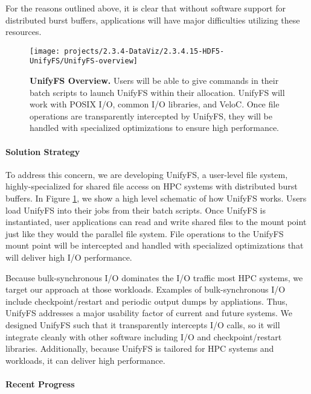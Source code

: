 For the reasons outlined above, it is clear that without software support 
for distributed burst buffers, applications
will have major difficulties utilizing these resources. 

\begin{figure}[htb]
        \centering
        \texttt{[image: projects/2.3.4-DataViz/2.3.4.15-HDF5-UnifyFS/UnifyFS-overview]}
        \caption{\label{fig:UnifyFS-overview} \textbf{UnifyFS Overview.} Users will be able to give commands in their batch scripts to launch UnifyFS within
their allocation. UnifyFS will work with POSIX I/O, common I/O libraries, and
VeloC. Once file operations are transparently intercepted by UnifyFS, they
will be handled with specialized optimizations to ensure high performance.}
\end{figure}

\paragraph{Solution Strategy}

To address this concern, we are developing UnifyFS, a user-level file system,
highly-specialized for shared file access on HPC systems with distributed
burst buffers. In Figure \ref{fig:UnifyFS-overview}, we show a high
level schematic of how UnifyFS works. Users load UnifyFS into
their jobs from their batch scripts. Once UnifyFS is instantiated, user
applications can read and write shared files to the mount point just like
they would the parallel file system. File operations to the UnifyFS
mount point will be intercepted and handled with specialized optimizations
that will deliver high I/O performance. 

Because bulk-synchronous I/O dominates the 
I/O traffic most HPC systems, we target our approach at
those workloads. Examples of bulk-synchronous I/O include checkpoint/restart
and periodic output dumps by appliations. Thus, UnifyFS  addresses a major usability
factor of current and future systems. We designed UnifyFS such
that it transparently intercepts I/O calls, so it will integrate
cleanly with other software including I/O and checkpoint/restart libraries.
Additionally, because UnifyFS is tailored for HPC systems and workloads,
it can deliver high performance.



\paragraph{Recent Progress}

